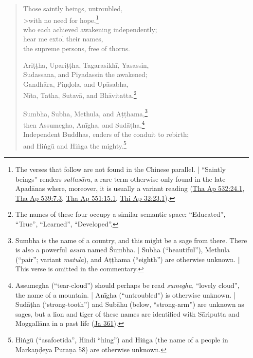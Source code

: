\documentclass[12pt,openany]{book}%
\begin{document}
\begin{verse}%
Those saintly beings, untroubled, \\>with no need for hope,\footnote{The verses that follow are not found in the Chinese parallel. | “Saintly beings” renders \textit{\textsanskrit{sattasāra}}, a rare term otherwise only found in the late \textsanskrit{Apadānas} where, moreover, it is usually a variant reading (\href{https://suttacentral.net/tha-ap532/en/sujato\#24.1}{Tha Ap 532:24.1}, \href{https://suttacentral.net/tha-ap539/en/sujato\#7.3}{Tha Ap 539:7.3}, \href{https://suttacentral.net/tha-ap551/en/sujato\#15.1}{Tha Ap 551:15.1}, \href{https://suttacentral.net/thi-ap32/en/sujato\#23.1}{Thi Ap 32:23.1}). } \\
who each achieved awakening independently; \\
hear me extol their names, \\
the supreme persons, free of thorns. 

\textsanskrit{Ariṭṭha}, \textsanskrit{Upariṭṭha}, \textsanskrit{Tagarasikhī}, Yasassin, \\
Sudassana, and Piyadassin the awakened; \\
\textsanskrit{Gandhāra}, \textsanskrit{Piṇḍola}, and \textsanskrit{Upāsabha}, \\
\textsanskrit{Nīta}, Tatha, \textsanskrit{Sutavā}, and \textsanskrit{Bhāvitatta}.\footnote{The names of these four occupy a similar semantic space: “Educated”, “True”, “Learned”, “Developed”. } 

Sumbha, Subha, Methula, and \textsanskrit{Aṭṭhama},\footnote{Sumbha is the name of a country, and this might be a sage from there. There is also a powerful \textit{asura} named Śumbha. | Subha (“beautiful”), Methula (“pair”; variant \textit{matula}), and \textsanskrit{Aṭṭhama} (“eighth”) are otherwise unknown. | This verse is omitted in the commentary. } \\
then Assumegha, \textsanskrit{Anīgha}, and \textsanskrit{Sudāṭha},\footnote{Assumegha (“tear-cloud”) should perhaps be read \textit{sumegha}, “lovely cloud”, the name of a mountain. | \textsanskrit{Anīgha} (“untroubled”) is otherwise unknown. | \textsanskrit{Sudāṭha} (‘strong-tooth”) and \textsanskrit{Subāhu} (below, “strong-arm”) are unknown as sages, but a lion and tiger of these names are identified with \textsanskrit{Sāriputta} and \textsanskrit{Moggallāna} in a past life (\href{https://suttacentral.net/ja361/en/sujato}{Ja 361}). } \\
Independent Buddhas, enders of the conduit to rebirth; \\
and \textsanskrit{Hiṅgū} and \textsanskrit{Hiṅga} the mighty.\footnote{\textsanskrit{Hiṅgū} (“asafoetida”, Hindi “hing”) and \textsanskrit{Hiṅga} (the name of a people in \textsanskrit{Mārkaṇḍeya} \textsanskrit{Purāṇa} 58) are otherwise unknown. } 


\end{verse}
\end{document}
